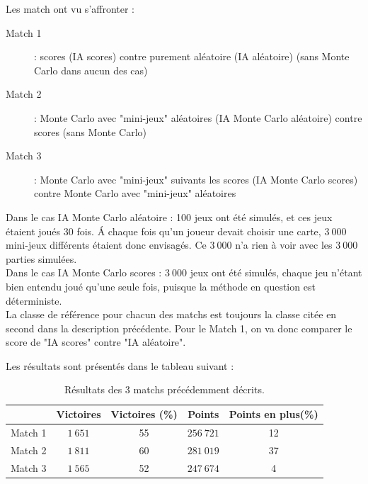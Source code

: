 \documentclass[a4paper,11pt]{article}
\begin{document}
Les match ont vu s'affronter :
\begin{description}
\item[Match 1] : scores (IA scores) contre purement aléatoire (IA aléatoire) (sans Monte Carlo dans aucun des cas)
\item[Match 2] : Monte Carlo avec "mini-jeux" aléatoires (IA Monte Carlo aléatoire) contre scores (sans Monte Carlo)
\item[Match 3] : Monte Carlo avec "mini-jeux" suivants les scores (IA Monte Carlo scores) contre Monte Carlo avec "mini-jeux" aléatoires
\end{description}
Dans le cas IA Monte Carlo aléatoire : 100 jeux ont été simulés, et ces jeux étaient joués 30 fois. \'A chaque fois qu'un joueur devait choisir une carte, $3~000$ mini-jeux différents étaient donc envisagés. Ce $3~000$ n'a rien à voir avec les $3~000$ parties simulées. \\
Dans le cas IA Monte Carlo scores : $3~000$ jeux ont été simulés, chaque jeu n'étant bien entendu joué qu'une seule fois, puisque la méthode en question est déterministe. \\
La classe de référence pour chacun des matchs est toujours la classe citée en second dans la description précédente. Pour le Match 1, on va donc comparer le score de "IA scores" contre "IA aléatoire".

Les résultats sont présentés dans le tableau suivant :

\begin{table}[H]
\centering
\begin{tabular}{c|cccc}
&Victoires & Victoires (\%) & Points & Points en plus(\%) \\
\hline
Match 1 & $1~651$ & 55 & $256~721$ & 12 \\
Match 2 & $1~811$ & 60 & $281~019$ & 37 \\
Match 3 & $1~565$ & 52 & $247~674$ & 4 \\
\end{tabular}
\caption{Résultats des 3 matchs précédemment décrits.}
\label{tab:resMatch}
\end{table}
\end{document}
